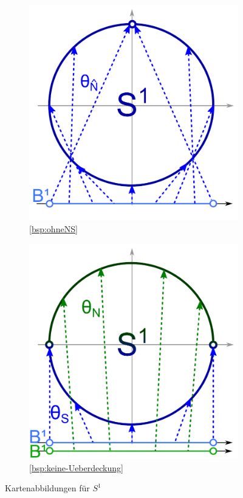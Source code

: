 \begin{figure}[h]
         \centering
         \begin{subfigure}[b]{0.3\textwidth}
                 \includegraphics[width=\textwidth]{Bilder/keine-ueberdeckung.pdf}
                 \caption{\cref{bsp:ohneNS}}
         \end{subfigure}%
 			\qquad\qquad
         \begin{subfigure}[b]{0.3\textwidth}
                 \includegraphics[width=\textwidth]{Bilder/ohne-aequator.pdf}
                 \caption{\cref{bsp:keine-Ueberdeckung}}
         \end{subfigure}
         \caption{Kartenabbildungen für $S^1$}
\end{figure}

